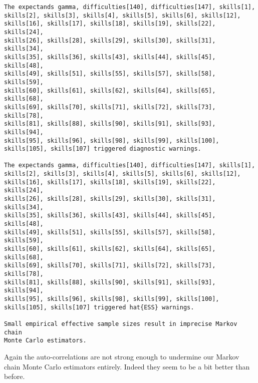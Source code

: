 \documentclass[
  letterpaper,
  DIV=11,
  numbers=noendperiod]{scrartcl}
\newenvironment{Shaded}{\begin{snugshade}}{\end{snugshade}}
\newcommand{\AttributeTok}[1]{\textcolor[rgb]{0.40,0.45,0.13}{#1}}
\newcommand{\DecValTok}[1]{\textcolor[rgb]{0.68,0.00,0.00}{#1}}
\newcommand{\FunctionTok}[1]{\textcolor[rgb]{0.28,0.35,0.67}{#1}}
\newcommand{\NormalTok}[1]{\textcolor[rgb]{0.00,0.23,0.31}{#1}}
\newcommand{\OtherTok}[1]{\textcolor[rgb]{0.00,0.23,0.31}{#1}}
\newcommand{\SpecialCharTok}[1]{\textcolor[rgb]{0.37,0.37,0.37}{#1}}
\newcommand{\StringTok}[1]{\textcolor[rgb]{0.13,0.47,0.30}{#1}}
\begin{document}
\begin{verbatim}
The expectands gamma, difficulties[140], difficulties[147], skills[1],
skills[2], skills[3], skills[4], skills[5], skills[6], skills[12],
skills[16], skills[17], skills[18], skills[19], skills[22], skills[24],
skills[26], skills[28], skills[29], skills[30], skills[31], skills[34],
skills[35], skills[36], skills[43], skills[44], skills[45], skills[48],
skills[49], skills[51], skills[55], skills[57], skills[58], skills[59],
skills[60], skills[61], skills[62], skills[64], skills[65], skills[68],
skills[69], skills[70], skills[71], skills[72], skills[73], skills[78],
skills[81], skills[88], skills[90], skills[91], skills[93], skills[94],
skills[95], skills[96], skills[98], skills[99], skills[100],
skills[105], skills[107] triggered diagnostic warnings.

The expectands gamma, difficulties[140], difficulties[147], skills[1],
skills[2], skills[3], skills[4], skills[5], skills[6], skills[12],
skills[16], skills[17], skills[18], skills[19], skills[22], skills[24],
skills[26], skills[28], skills[29], skills[30], skills[31], skills[34],
skills[35], skills[36], skills[43], skills[44], skills[45], skills[48],
skills[49], skills[51], skills[55], skills[57], skills[58], skills[59],
skills[60], skills[61], skills[62], skills[64], skills[65], skills[68],
skills[69], skills[70], skills[71], skills[72], skills[73], skills[78],
skills[81], skills[88], skills[90], skills[91], skills[93], skills[94],
skills[95], skills[96], skills[98], skills[99], skills[100],
skills[105], skills[107] triggered hat{ESS} warnings.

Small empirical effective sample sizes result in imprecise Markov chain
Monte Carlo estimators.
\end{verbatim}

Again the auto-correlations are not strong enough to undermine our
Markov chain Monte Carlo estimators entirely. Indeed they seem to be a
bit better than before.

\begin{Shaded}
\end{Shaded}
\end{document}
